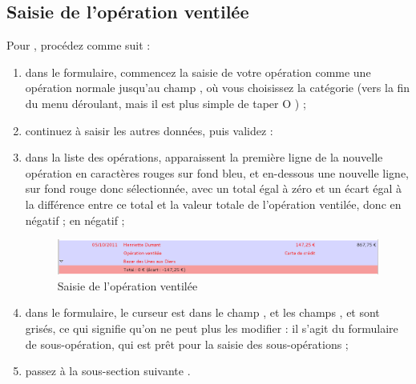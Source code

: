 \subsection{Saisie de l'opération ventilée\label{transactions-breakdown-master}}

Pour , procédez comme suit :
	 
\begin{enumerate}
	 \item dans le formulaire, commencez la saisie de votre opération comme une opération normale jusqu'au champ , où vous choisissez la catégorie  (vers la fin du menu déroulant, mais il est plus simple de taper \og O \fg{}) ;
	 \item continuez à saisir les autres données, puis validez :
	 \item dans la liste des opérations, apparaissent la première ligne de la nouvelle opération en caractères rouges sur fond bleu{\couleur}, et en-dessous une nouvelle ligne, sur fond rouge{\couleur} donc sélectionnée, avec un total égal à zéro et un  écart égal à la différence entre ce total et la valeur totale de l'opération ventilée, donc \ifIllustration en négatif ;
	\else en négatif ;
	\fi
	
	\ifIllustration
	\begin{figure}[htbp]
	\begin{center}
	\includegraphics[scale=0.5]{image/screenshot/transactions_breakdown}
	\end{center}
	\caption{Saisie de l'opération ventilée}
	\label{transactions-breakdown-img}
	\end{figure}
	\fi

	 \item dans le formulaire, le curseur est dans le champ , et les champs  ,  et  sont grisés, ce qui signifie qu'on ne peut plus les modifier : il s'agit du formulaire de sous-opération, qui est prêt pour la saisie des sous-opérations ;
	 \item passez à la sous-section suivante .
\end{enumerate}


